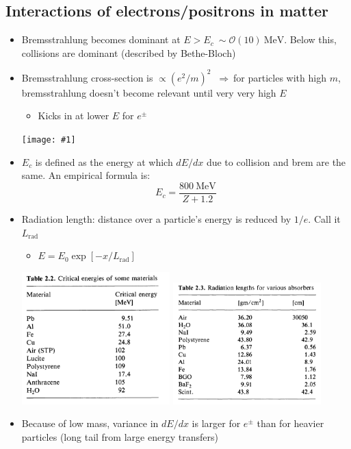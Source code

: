 \documentclass[11pt]{article}
\newcommand{\mev}{\text{MeV}}
\newcommand{\ord}[1]{\ensuremath{\mathcal{O}(#1)}}
\newcommand{\thus}{$~\Rightarrow~$}
\newcommand{\embedimgw}[2]{\begin{center}\texttt{[image: \#1]}\end{center}}
\newcommand{\lrad}{\ensuremath{L_\text{rad}}}
\begin{document}
\subsection{Interactions of electrons/positrons in matter}
\begin{itemize}
  \item Bremsstrahlung becomes dominant at $E>E_c~\sim\ord{10}~\mev$. Below this, collisions are dominant (described by Bethe-Bloch)
  \item Bremsstrahlung cross-section is $\propto (e^2/m)^2$ \thus for particles with high $m$, bremsstrahlung doesn't become relevant until very very high $E$
  \begin{itemize}
    \item Kicks in at lower $E$ for $e^\pm$
  \end{itemize}
  \embedimgw{figs/dEdx_electrons.png}{0.8}
  \item $E_c$ is defined as the energy at which $dE/dx$ due to collision and brem are the same. An empirical formula is:
  \begin{equation}
    E_c = \frac{800~\mev}{Z+1.2}
  \end{equation}
  \item Radiation length: distance over a particle's energy is reduced by $1/e$. Call it $\lrad$
  \begin{itemize}
    \item $E=E_0 \exp[-x/\lrad]$
  \end{itemize}
  \begin{center}
    \includegraphics[width=0.45\textwidth]{figs/ecrit_table.png}
    \includegraphics[width=0.45\textwidth]{figs/radlength_table.png}
  \end{center}
  \item Because of low mass, variance in $dE/dx$ is larger for $e^\pm$ than for heavier particles (long tail from large energy transfers)
\end{itemize}
\end{document}
